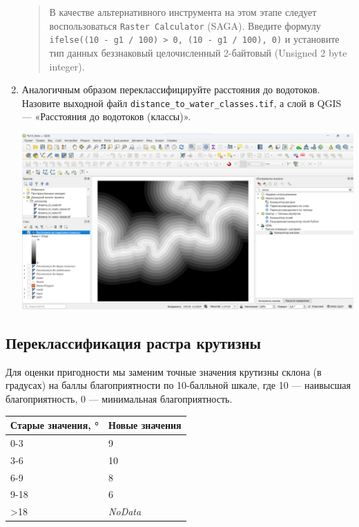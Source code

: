 \documentclass[
  12pt,
]{book}
\begin{document}
\begin{enumerate}
  \begin{quote}
  В качестве альтернативного инструмента на этом этапе следует воспользоваться \texttt{Raster\ Calculator} (SAGA). Введите формулу \texttt{ifelse((10\ -\ g1\ /\ 100)\ \textgreater{}\ 0,\ (10\ -\ g1\ /\ 100),\ 0)} и установите тип данных беззнаковый целочисленный 2-байтовый (Unsigned 2 byte integer).
  \end{quote}
\item
  Аналогичным образом переклассифицируйте расстояния до водотоков. Назовите выходной файл \texttt{distance\_to\_water\_classes.tif}, а слой в QGIS --- «Расстояния до водотоков (классы)».

  \includegraphics{images/Ex12/distance_to_water_classes.png}
\end{enumerate}

\hypertarget{weighted-overlay-reclass-slope}{%
\subsection{Переклассификация растра крутизны}\label{weighted-overlay-reclass-slope}}

Для оценки пригодности мы заменим точные значения крутизны склона (в градусах) на баллы благоприятности по 10-балльной шкале, где 10 --- наивысшая благоприятность, 0 --- минимальная благоприятность.

\begin{longtable}[]{@{}ll@{}}
\toprule()
Старые значения, ° & Новые значения \\
\midrule()
\endhead
0-3 & 9 \\
3-6 & 10 \\
6-9 & 8 \\
9-18 & 6 \\
\textgreater18 & \emph{NoData} \\
\bottomrule()
\end{longtable}
\end{document}
